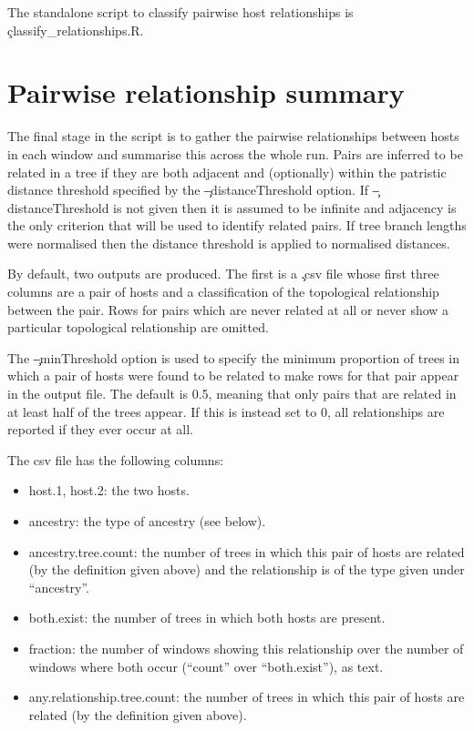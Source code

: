 The standalone script to classify pairwise host relationships is \c{classify\_relationships.R}.

\section{Pairwise relationship summary}\label{sec:ClassificationSummary}

The final stage in the script is to gather the pairwise relationships between hosts in each window and summarise this across the whole run.
Pairs are inferred to be related in a tree if they are both adjacent and (optionally) within the patristic distance threshold specified by the \c{--distanceThreshold} option.
If \c{--distanceThreshold} is not given then it is assumed to be infinite and adjacency is the only criterion that will be used to identify related pairs.
If tree branch lengths were normalised then the distance threshold is applied to normalised distances.

By default, two outputs are produced. The first is a \c{.csv} file whose first three columns are a pair of hosts and a classification of the topological relationship between the pair.
Rows for pairs which are never related at all or never show a particular topological relationship are omitted.

The \c{--minThreshold} option is used to specify the minimum proportion of trees in which a pair of hosts were found to be related to make rows for that pair appear in the output file. The default is 0.5, meaning that only pairs that are related in at least half of the trees appear. If this is instead set to 0, all relationships are reported if they ever occur at all.

The csv file has the following columns:
\begin{itemize}
\item host.1, host.2: the two hosts.
\item ancestry: the type of ancestry (see below).
\item ancestry.tree.count: the number of trees in which this pair of hosts are related (by the definition given above) and the relationship is of the type given under ``ancestry''.
\item both.exist: the number of trees in which both hosts are present.
\item fraction: the number of windows showing this relationship over the number of windows where both occur (``count'' over ``both.exist''), as text.
\item any.relationship.tree.count: the number of trees in which this pair of hosts are related (by the definition given above).
\end{itemize}

